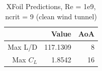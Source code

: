 \begin{table}[]
\caption{XFoil Predictions, Re = 1e9, ncrit = 9 (clean wind tunnel)}
	\centering
	\begin{tabular}{|r|r|r|} \hline
				& Value	& AoA \\ \hline \hline
		Max L/D & 117.1309 & 8 \\ \hline
		Max $C_L$ & 1.8542 & 16 \\ \hline	
	\end{tabular}
\end{table}


